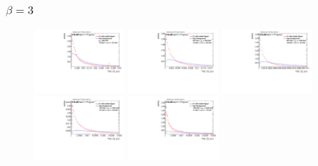 \subsubsection*{$\beta=3$}
\begin{figure}[H]
\includegraphics[width=0.3\textwidth]{sascha_input/Appendix/Distributions/higgs/distributions/beta3/h_assisted_tj_C2_3_bin1.pdf} \hspace{1mm}
\includegraphics[width=0.3\textwidth]{sascha_input/Appendix/Distributions/higgs/distributions/beta3/h_assisted_tj_C2_3_bin2.pdf} \hspace{4mm}
\includegraphics[width=0.3\textwidth]{sascha_input/Appendix/Distributions/higgs/distributions/beta3/h_assisted_tj_C2_3_bin3.pdf} 
\bigskip
\includegraphics[width=0.3\textwidth]{sascha_input/Appendix/Distributions/higgs/distributions/beta3/h_assisted_tj_C2_3_bin4.pdf} \hspace{4mm}
\includegraphics[width=0.3\textwidth]{sascha_input/Appendix/Distributions/higgs/distributions/beta3/h_assisted_tj_C2_3_bin5.pdf} 


\end{figure}

